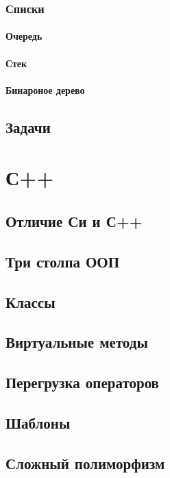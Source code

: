\documentclass{bmstu}
\begin{document}
\subsection{Списки}
\subsubsection{Очередь}
\subsubsection{Стек}
\subsubsection{Бинароное дерево}

\section{Задачи}

\chapter{С++}
\section{Отличие Си и С++}
\section{Три столпа ООП}
\section{Классы}
\section{Виртуальные методы}
\section{}
\section{Перегрузка операторов}
\section{Шаблоны}
\section{Сложный полиморфизм}
\section{}
\end{document}
